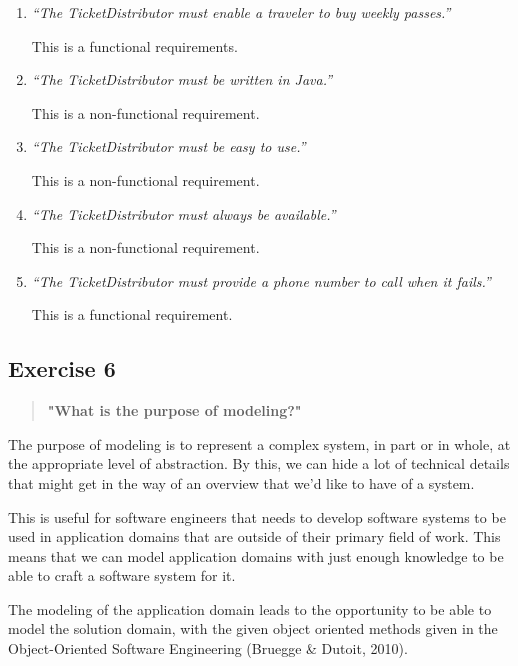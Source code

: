 \documentclass[12pt,letterpaper]{article}
\begin{document}
\begin{enumerate}
    \item \textit{“The TicketDistributor must enable a traveler to buy weekly passes.”}
    
    This is a functional requirements.
    \item \textit{“The TicketDistributor must be written in Java.”}
    
    This is a non-functional requirement.
    \item \textit{“The TicketDistributor must be easy to use.”}
    
    This is a non-functional requirement.
    \item \textit{“The TicketDistributor must always be available.”}
    
    This is a non-functional requirement.
    \item \textit{“The TicketDistributor must provide a phone number to call when it fails.”}

    This is a functional requirement. 
\end{enumerate}


\subsection{Exercise 6}

\begin{quote}
  \textbf{"What is the purpose of modeling?"}
\end{quote}

The purpose of modeling is to represent a complex system, in part or in whole, at 
the appropriate level of abstraction. By this, we can hide a lot of technical details that
might get in the way of an overview that we'd like to have of a system.

This is useful for software engineers that needs to develop software systems to be used in
application domains that are outside of their primary field of work. This means that we can model
application domains with just enough knowledge to be able to craft a software system for it.

The modeling of the application domain leads to the opportunity to be able to model
the solution domain, with the given object oriented methods given in the 
Object-Oriented Software Engineering (Bruegge & Dutoit, 2010). 
\end{document}
